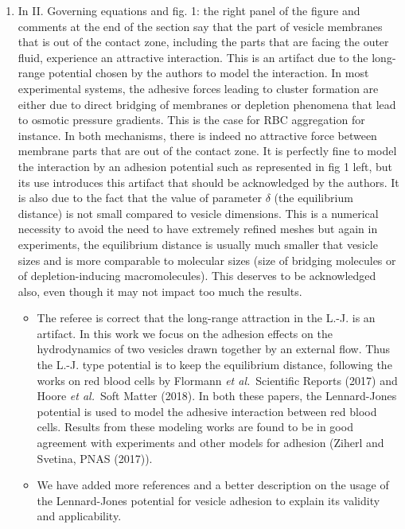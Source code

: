 \documentclass[11pt]{article}
\newcommand{\comment}[1]{{\color{blue} #1}}
\begin{document}
\begin{enumerate}
\item\comment{In II. Governing equations and fig. 1: the right panel of the
figure and comments at the end of the section say that the part of
vesicle membranes that is out of the contact zone, including the parts
that are facing the outer fluid, experience an attractive interaction.
This is an artifact due to the long-range potential chosen by the
authors to model the interaction. In most experimental systems, the
adhesive forces leading to cluster formation are either due to direct
bridging of membranes or depletion phenomena that lead to osmotic
pressure gradients. This is the case for RBC aggregation for instance.
In both mechanisms, there is indeed no attractive force between membrane
parts that are out of the contact zone. It is perfectly fine to model
the interaction by an adhesion potential such as represented in fig 1
left, but its use introduces this artifact that should be acknowledged
by the authors. It is also due to the fact that the value of parameter
$\delta$ (the equilibrium distance) is not small compared to vesicle
dimensions. This is a numerical necessity to avoid the need to have
extremely refined meshes but again in experiments, the equilibrium
distance is usually much smaller that vesicle sizes and is more
comparable to molecular sizes (size of bridging molecules or of
depletion-inducing macromolecules). This deserves to be acknowledged
also, even though it may not impact too much the results.}
\begin{itemize}
  \item The referee is correct that the long-range attraction in the L.-J. is an artifact.
   In this work we focus on the adhesion effects on the hydrodynamics 
   of two vesicles drawn together by an external flow.
   Thus the L.-J. type potential is to keep the equilibrium distance, 
   following the works on red blood cells by Flormann {\em et al.}~Scientific
    Reports (2017) and Hoore {\em et al.}~Soft Matter (2018).  In both
    these papers, the Lennard-Jones potential is used to model the
    adhesive interaction between red blood cells.  
    Results from these modeling works are found to be in good agreement 
    with experiments and other models for adhesion (Ziherl and Svetina, PNAS (2017)).
    
    

  \item We have added more references and a better description on the
    usage of the Lennard-Jones potential for vesicle adhesion to explain
    its validity and applicability.


\end{itemize}
\end{enumerate}
\end{document}

